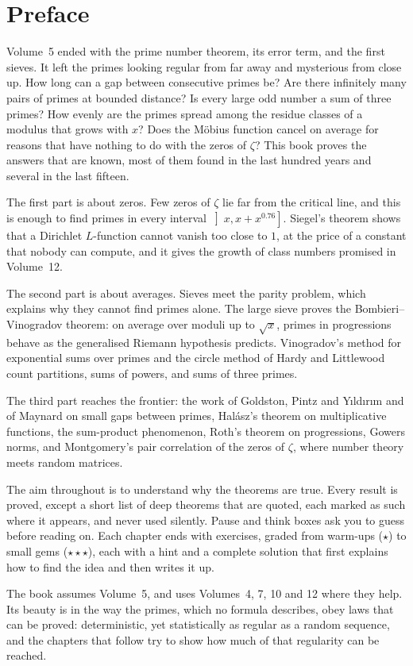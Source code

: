 \chapter*{Preface}
Volume~5 ended with the prime number theorem, its error term, and the first sieves. It left the primes looking regular from far away and mysterious from close up. How long can a gap between consecutive primes be? Are there infinitely many pairs of primes at bounded distance? Is every large odd number a sum of three
primes? How evenly are the primes spread among the residue classes of a modulus that grows with $x$? Does the M\"obius function cancel on average for reasons that have nothing to do with the zeros of $\zeta$? This book proves the answers that are known, most of them found in the last hundred years and several in the last fifteen.

The first part is about zeros. Few zeros of $\zeta$ lie far from the critical line, and this is enough to find primes in every interval $\left]x,x+x^{0.76}\right]$. Siegel's theorem shows that a Dirichlet $L$-function cannot vanish too close to $1$, at the price of a constant that nobody can compute, and it gives the growth of class numbers promised in Volume~12.

The second part is about averages. Sieves meet the parity problem, which explains why they cannot find primes alone. The large sieve proves the Bombieri--Vinogradov theorem: on average over moduli up to $\sqrt x$, primes in progressions behave as the generalised Riemann hypothesis predicts. Vinogradov's method for exponential sums over primes and the circle method
of Hardy and Littlewood count partitions, sums of powers, and sums of three primes.

The third part reaches the frontier: the work of Goldston, Pintz and Y\i ld\i r\i m and of Maynard on small gaps between primes, Hal\'asz's theorem on multiplicative functions, the sum-product phenomenon, Roth's theorem on progressions, Gowers norms, and Montgomery's pair correlation of the zeros of $\zeta$, where number theory meets random matrices.

The aim throughout is to understand why the theorems are true. Every result is proved, except a short list of deep theorems that are quoted, each marked as such where it appears, and never used silently. Pause and think boxes ask you to guess before reading on. Each chapter ends with exercises, graded from warm-ups ($\star$) to small
gems ($\star\star\star$), each with a hint and a complete solution that first explains how to find the idea and then writes it up.

The book assumes Volume~5, and uses Volumes~4, 7, 10 and 12 where they help. Its beauty is in the way the primes, which no formula describes, obey laws that can be proved: deterministic, yet statistically as regular as a random sequence, and the chapters that follow try to show how much of that regularity can be reached.
